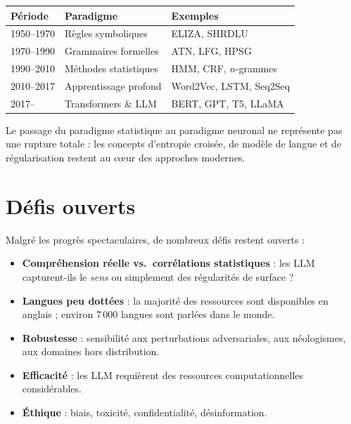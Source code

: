 \begin{center}
\renewcommand{\arraystretch}{1.2}
\begin{tabular}{lll}
\toprule
\textbf{P\'eriode} & \textbf{Paradigme} & \textbf{Exemples} \\
\midrule
1950--1970 & R\`egles symboliques & ELIZA, SHRDLU \\
1970--1990 & Grammaires formelles & ATN, LFG, HPSG \\
1990--2010 & M\'ethodes statistiques & HMM, CRF, $n$-grammes \\
2010--2017 & Apprentissage profond & Word2Vec, LSTM, Seq2Seq \\
2017--      & Transformers \& LLM & BERT, GPT, T5, LLaMA \\
\bottomrule
\end{tabular}
\end{center}

\begin{remarque}
Le passage du paradigme statistique au paradigme neuronal ne repr\'esente pas
une rupture totale : les concepts d'entropie crois\'ee, de mod\`ele de langue
et de r\'egularisation restent au c\oe ur des approches modernes.
\end{remarque}

\section{D\'efis ouverts}
\label{sec:intro:defis}

Malgr\'e les progr\`es spectaculaires, de nombreux d\'efis restent ouverts :

\begin{itemize}
    \item \textbf{Compr\'ehension r\'eelle vs.\ corr\'elations statistiques} :
          les LLM capturent-ils le \emph{sens} ou simplement des
          r\'egularit\'es de surface ?
    \item \textbf{Langues peu dott\'ees} : la majorit\'e des ressources sont
          disponibles en anglais ; environ 7\,000 langues sont parl\'ees dans
          le monde.
    \item \textbf{Robustesse} : sensibilit\'e aux perturbations adversariales,
          aux n\'eologismes, aux domaines hors distribution.
    \item \textbf{Efficacit\'e} : les LLM requi\`erent des ressources
          computationnelles consid\'erables.
    \item \textbf{\'Ethique} : biais, toxicit\'e, confidentialit\'e,
          d\'esinformation.
\end{itemize}

